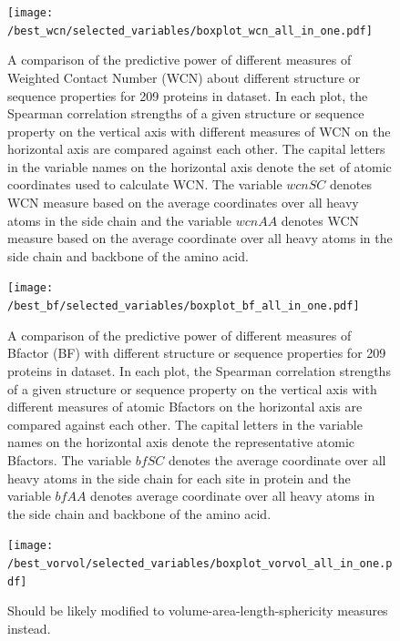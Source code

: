 \documentclass[11pt]{article}
\begin{document}
        \begin{figure}[tbh]
            \begin{center}
            \texttt{[image: /best\_wcn/selected\_variables/boxplot\_wcn\_all\_in\_one.pdf]}
            \end{center}
            \caption{A comparison of the predictive power of different measures of Weighted Contact Number (WCN) about different structure or sequence properties for 209 proteins in dataset. In each plot, the Spearman correlation strengths of a given structure or sequence property on the vertical axis with different measures of WCN on the horizontal axis are compared against each other. The capital letters in the variable names on the horizontal axis denote the set of atomic coordinates used to calculate WCN. The variable $wcnSC$ denotes WCN measure based on the average coordinates over all heavy atoms in the side chain and the variable $wcnAA$ denotes WCN measure based on the average coordinate over all heavy atoms in the side chain and backbone of the amino acid.}
            \label{fig:best_wcn}
        \end{figure}

        \begin{figure}[tbh]
            \begin{center}
            \texttt{[image: /best\_bf/selected\_variables/boxplot\_bf\_all\_in\_one.pdf]}
            \end{center}
            \caption{A comparison of the predictive power of different measures of Bfactor (BF) with different structure or sequence properties for 209 proteins in dataset. In each plot, the Spearman correlation strengths of a given structure or sequence property on the vertical axis with different measures of atomic Bfactors on the horizontal axis are compared against each other. The capital letters in the variable names on the horizontal axis denote the representative atomic Bfactors. The variable $bfSC$ denotes the average coordinate over all heavy atoms in the side chain for each site in protein and the variable $bfAA$ denotes average coordinate over all heavy atoms in the side chain and backbone of the amino acid.}
            \label{fig:best_bf}
        \end{figure}

        \begin{figure}[tbh]
            \begin{center}
            \texttt{[image: /best\_vorvol/selected\_variables/boxplot\_vorvol\_all\_in\_one.pdf]}
            \end{center}
            \caption{Should be likely modified to volume-area-length-sphericity measures instead.}
            \label{fig:best_voronoi}
        \end{figure}
\end{document}
